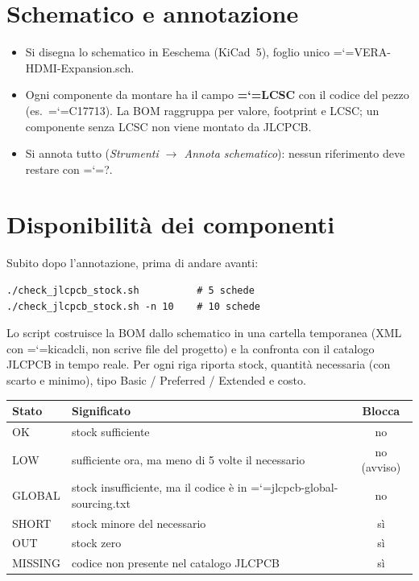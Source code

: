 \documentclass[11pt,a4paper]{article}
\makeatletter
\newcommand{\file}[1]{{\ttfamily\hyphenchar\font=`\-\relax\language=\l@nohyphenation #1}}
\makeatother
\begin{document}
\section{Schematico e annotazione}

\begin{itemize}[leftmargin=*]
  \item Si disegna lo schematico in Eeschema (KiCad~5), foglio unico
        \file{VERA-HDMI-Expansion.sch}.
  \item Ogni componente da montare ha il campo \textbf{\file{LCSC}} con il
        codice del pezzo (es.\ \file{C17713}). La BOM raggruppa per valore,
        footprint e LCSC; un componente senza LCSC non viene montato da
        JLCPCB.
  \item Si annota tutto (\emph{Strumenti $\rightarrow$ Annota schematico}):
        nessun riferimento deve restare con \file{?}.
\end{itemize}

\section{Disponibilità dei componenti}

Subito dopo l'annotazione, prima di andare avanti:

\begin{lstlisting}[style=shell]
./check_jlcpcb_stock.sh          # 5 schede
./check_jlcpcb_stock.sh -n 10    # 10 schede
\end{lstlisting}

Lo script costruisce la BOM dallo schematico in una cartella temporanea (XML
con \file{kicadcli}, non scrive file del progetto) e la confronta con il catalogo JLCPCB in tempo reale.
Per ogni riga riporta stock, quantità necessaria (con scarto e minimo), tipo
Basic / Preferred / Extended e costo.

\begin{center}
\begin{tabularx}{\linewidth}{>{\ttfamily}l L c}
\toprule
\normalfont\textbf{Stato} & \textbf{Significato} & \textbf{Blocca} \\
\midrule
OK      & stock sufficiente & no \\
LOW     & sufficiente ora, ma meno di 5 volte il necessario & no (avviso) \\
GLOBAL  & stock insufficiente, ma il codice è in \file{jlcpcb-global-sourcing.txt} & no \\
SHORT   & stock minore del necessario & sì \\
OUT     & stock zero & sì \\
MISSING & codice non presente nel catalogo JLCPCB & sì \\
\bottomrule
\end{tabularx}
\end{center}
\end{document}
